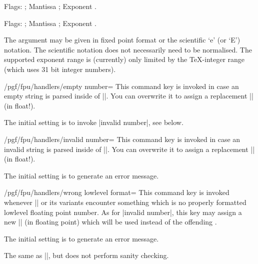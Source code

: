 \begin{command}{\pgfmathfloatparsenumber{}}
\begin{codeexample}[]
\pgfmathfloattomacro{\pgfmathresult}{\F}{\M}{\E}
Flags: \F; Mantissa \M; Exponent \E.
\end{codeexample}

\begin{codeexample}[]
\pgfmathfloattomacro{\pgfmathresult}{\F}{\M}{\E}
Flags: \F; Mantissa \M; Exponent \E.
\end{codeexample}
	The argument  may be given in fixed point format or the scientific `e' (or `E') notation. The scientific notation does not necessarily need to be normalised. The supported exponent range is (currently) only limited by the \TeX-integer range (which uses 31 bit integer numbers).
\end{command}

\begin{key}{/pgf/fpu/handlers/empty number=}
	This command key is invoked in case an empty string is parsed inside of |\pgfmathfloatparsenumber|. You can overwrite it to assign a replacement |\pgfmathresult| (in float!).

	The initial setting is to invoke |invalid number|, see below.
\end{key}
\begin{key}{/pgf/fpu/handlers/invalid number=}
	This command key is invoked in case an invalid string is parsed inside of |\pgfmathfloatparsenumber|. You can overwrite it to assign a replacement |\pgfmathresult| (in float!).

	The initial setting is to generate an error message.
\end{key}
\begin{key}{/pgf/fpu/handlers/wrong lowlevel format=}
	This command key is invoked whenever |\pgfmathfloattoregisters| or its variants encounter something which is no properly formatted lowlevel floating point number. As for |invalid number|, this key may assign a new |\pgfmathresult| (in floating point) which will be used instead of the offending .

	The initial setting is to generate an error message.
\end{key}

\begin{command}{\pgfmathfloatqparsenumber{}}
	The same as |\pgfmathfloatparsenumber|, but does not perform sanity checking.
\end{command}

